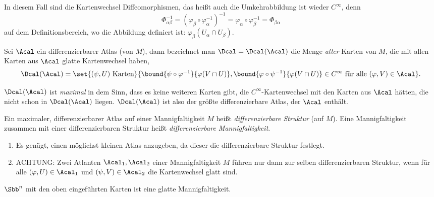 \begin{rem*}
	In diesem Fall sind die Kartenwechsel Diffeomorphismen, das heißt auch die Umkehrabbildung ist wieder $C^\infty$, denn
	\[ \Phi_{\alpha\beta}^{-1} = \left(\varphi_\beta \circ \varphi_\alpha^{-1}\right)^{-1} = \varphi_\alpha \circ \varphi_\beta^{-1} = \Phi_{\beta\alpha} \]
	auf dem Definitionsbereich, wo die Abbildung definiert ist: $ \varphi_\beta(U_\alpha \cap U_\beta). $
\end{rem*}

\begin{defn}
	Sei $\Acal$ ein differenzierbarer Atlas (von $M$), dann bezeichnet man $\Dcal = \Dcal(\Acal)$ die Menge \emph{aller} Karten von $M$, die mit allen Karten aus $\Acal$ glatte Kartenwechsel haben,
	\[ \Dcal(\Acal) = \set{(\psi,U) \ \text{Karten}}{\bound{\psi \circ \varphi^{-1}}{\varphi(V \cap U)}, \bound{\varphi \circ \psi^{-1}}{\varphi(V \cap U)} \in C^\infty \ \text{für alle } (\varphi,V) \in \Acal}. \]
	\begin{rem*}
		$\Dcal(\Acal)$ ist \emph{maximal} in dem Sinn, dass es keine weiteren Karten gibt, die $C^\infty$-Kartenwechsel mit den Karten aus $\Acal$ hätten, die nicht schon in $\Dcal(\Acal)$ liegen. $\Dcal(\Acal)$ ist also der größte differenzierbare Atlas, der $\Acal$ enthält.
	\end{rem*}
	\begin{notat*}
		Ein maximaler, differenzierbarer Atlas auf einer Mannigfaltigkeit $M$ heißt \emph{differenzierbare Struktur} (auf $M$). Eine Mannigfaltigkeit zusammen mit einer differenzierbaren Struktur heißt \emph{differenzierbare Mannigfaltigkeit}.
	\end{notat*}
\end{defn}

\begin{rem*}
	\begin{enumerate}[label = {\roman*})]
		\item Es genügt, einen möglichst kleinen Atlas anzugeben, da dieser die differenzierbare Struktur festlegt.
		\item ACHTUNG: Zwei Atlanten $ \Acal_1,\Acal_2 $ einer Mannigfaltigkeit $M$ führen nur dann zur selben differenzierbaren Struktur, wenn für alle $ (\varphi,U) \in \Acal_1 $ und $ (\psi,V) \in \Acal_2 $ die Kartenwechsel glatt sind.
	\end{enumerate}
\end{rem*}

\begin{exmp*}
	$ \Sbb^n $ mit den oben eingeführten Karten ist eine glatte Mannigfaltigkeit.
\end{exmp*}
	
